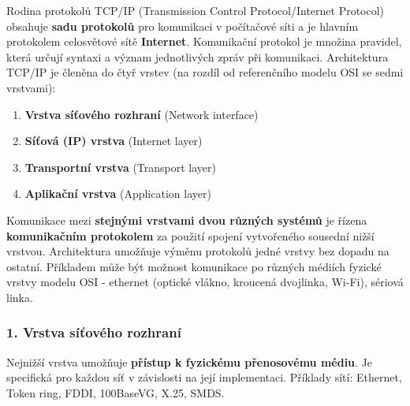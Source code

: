 Rodina protokolů TCP/IP (Transmission Control Protocol/Internet Protocol) obsahuje \textbf{sadu protokolů} pro komunikaci v počítačové síti a je hlavním protokolem celosvětové sítě \textbf{Internet}. Komunikační protokol je množina pravidel, která určují syntaxi a význam jednotlivých zpráv při komunikaci. Architektura TCP/IP je členěna do čtyř vrstev (na rozdíl od referenčního modelu OSI se sedmi vrstvami):

\begin{enumerate}
	\item \textbf{Vrstva síťového rozhraní} (Network interface)
	\item \textbf{Síťová (IP) vrstva} (Internet layer)
	\item \textbf{Transportní vrstva} (Transport layer)
	\item \textbf{Aplikační vrstva }(Application layer)
\end{enumerate}

\noindent{}

Komunikace mezi \textbf{stejnými vrstvami dvou různých systémů} je řízena \textbf{komunikačním protokolem} za použití spojení vytvořeného sousední nižší vrstvou. Architektura umožňuje výměnu protokolů jedné vrstvy bez dopadu na ostatní. Příkladem může být možnost komunikace po různých médiích fyzické vrstvy modelu OSI - ethernet (optické vlákno, kroucená dvojlinka, Wi-Fi), sériová linka.


\subsubsection*{1. Vrstva síťového rozhraní}
Nejnižší vrstva umožňuje \textbf{přístup k fyzickému přenosovému médiu}. Je specifická pro každou síť v závislosti na její implementaci. Příklady sítí: Ethernet, Token ring, FDDI, 100BaseVG, X.25, SMDS.

